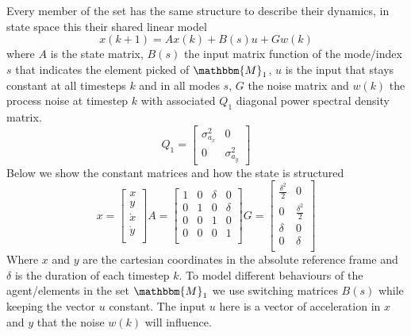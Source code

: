 \documentclass[twocolumn]{article}
\begin{document}
    Every member of the set has the same structure 
    to describe their dynamics, in state space this their shared linear model
    \begin{equation}
        x(k+1)= Ax(k) + B(s)u + Gw(k)
    \end{equation}
    where $A$ is the state matrix, $B(s)$ the input matrix function of the mode/index $s$ that indicates the element picked of $\mathbbm{M}_{1}$, 
    $u$ is the input that stays constant at all timesteps $k$ and in all modes $s$, $G$ the noise matrix and $w(k)$ the process noise at timestep
     $k$ with associated $Q_{1}$ diagonal power spectral density matrix.
     \begin{equation*}
        Q_{1}=\begin{bmatrix}
            \sigma^{2}_{a_{x}}&0\\
            0&\sigma^{2}_{a_{y}}
        \end{bmatrix}
    \end{equation*}
     Below we show the constant matrices and how the state is structured
    \[ x=\begin{bmatrix} x \\ y \\ \dot{x} \\ \dot{y} \\ \end{bmatrix}  A=\begin{bmatrix}
        1 & 0 & \delta & 0      \\
        0 & 1 & 0      & \delta \\
        0 & 0 & 1      & 0      \\
        0 & 0 & 0      & 1      \\
    \end{bmatrix}
    G=\begin{bmatrix}
        \frac{\delta^{2}}{2} & 0          \\
        0          & \frac{\delta^{2}}{2} \\
        \delta     & 0          \\
        0          & \delta     \\
    \end{bmatrix}
\]
Where $x$ and $y$ are the cartesian coordinates in the absolute reference frame and $\delta$ is the duration of each timestep $k$.
To model different behaviours of the agent/elements in the set $\mathbbm{M}_{1}$ we use switching matrices $B(s)$ while keeping the vector $u$ 
constant. The input $u$ here is a vector of acceleration in $x$ and $y$ that the noise $w(k)$ will influence.
\end{document}

